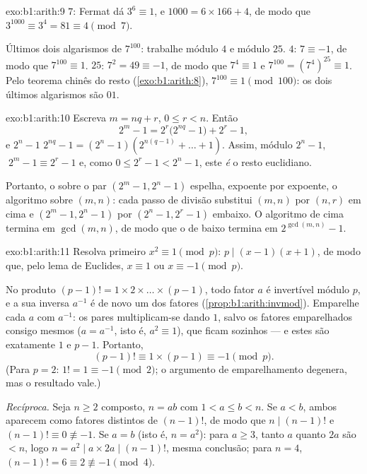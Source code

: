 \begin{solution}{exo:b1:arith:9}
 $7$: Fermat dá $3^6 \equiv 1$, e $1000 = 6 \times 166 + 4$,
de modo que $3^{1000} \equiv 3^4 = 81 \equiv 4 \pmod 7$.

Últimos dois algarismos de $7^{100}$: trabalhe módulo $4$ e módulo $25$.
 $4$: $7
\equiv -1$, de modo que $7^{100} \equiv 1$.  $25$: $7^2 = 49 \equiv -1$, de modo que
$7^4 \equiv 1$ e $7^{100} = (7^4)^{25} \equiv 1$. Pelo teorema chinês
do resto (\cref{exo:b1:arith:8}), $7^{100} \equiv 1
\pmod{100}$: os dois últimos algarismos são $01$.
\end{solution}

\begin{solution}{exo:b1:arith:10}
Escreva $m = nq + r$, $0 \leq r < n$. Então
\[
2^m - 1 = 2^r\bigl(2^{nq} - 1\bigr) + 2^r - 1,
\]
e $2^n - 1$  $2^{nq} - 1 = (2^n - 1)(2^{n(q-1)} + \dots +
1)$. Assim, módulo $2^n - 1$, $\;2^m - 1 \equiv 2^r - 1$ e, como $0 \leq
2^r - 1 < 2^n - 1$, este \emph{é} o resto euclidiano.

Portanto, o  sobre o par $(2^m - 1, 2^n - 1)$
espelha, expoente por expoente, o algoritmo sobre $(m, n)$: cada
passo de divisão substitui $(m, n)$ por $(n, r)$ em cima e $(2^m - 1,
2^n - 1)$ por $(2^n - 1, 2^r - 1)$ embaixo. O algoritmo de cima
termina em $\gcd(m,n)$, de modo que o de baixo termina em
$2^{\gcd(m,n)} - 1$.
\end{solution}

\begin{solution}{exo:b1:arith:11}
Resolva primeiro $x^2 \equiv 1 \pmod p$: $p \mid (x-1)(x+1)$, de modo que, pelo
lema de Euclides, $x \equiv 1$ ou $x \equiv -1 \pmod p$.

No produto $(p-1)! = 1 \times 2 \times \dots \times (p-1)$, todo
fator $a$ é invertível módulo $p$, e a sua inversa $a^{-1}$ é de novo
um dos fatores (\cref{prop:b1:arith:invmod}). Emparelhe cada $a$ com
$a^{-1}$: os pares multiplicam-se dando $1$, salvo os fatores
emparelhados consigo mesmos ($a = a^{-1}$, isto é, $a^2 \equiv 1$), que ficam
sozinhos --- e estes são exatamente $1$ e $p - 1$. Portanto,
\[
(p-1)! \equiv 1 \times (p - 1) \equiv -1 \pmod p .
\]
(Para $p = 2$: $1! = 1 \equiv -1 \pmod 2$; o argumento de emparelhamento
degenera, mas o resultado vale.)

\emph{Recíproca.} Seja $n \geq 2$ composto, $n = ab$ com $1 < a
\leq b < n$. Se $a < b$, ambos aparecem como fatores distintos de $(n-1)!$,
de modo que $n \mid (n-1)!$ e $(n-1)! \equiv 0 \not\equiv -1$. Se $a = b$
(isto é, $n = a^2$): para $a \geq 3$, tanto $a$ quanto $2a$ são $< n$, logo
$n = a^2 \mid a \times 2a \mid (n-1)!$, mesma conclusão; para $n = 4$,
$(n-1)! = 6 \equiv 2 \not\equiv -1 \pmod 4$.
\end{solution}

